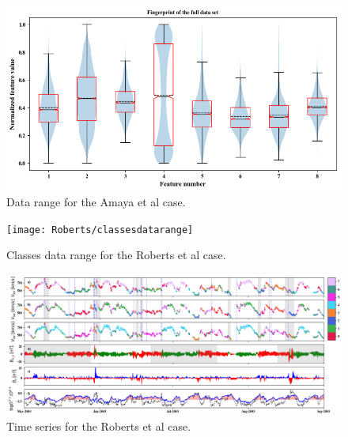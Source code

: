 \documentclass[utf8]{frontiersSCNS} %
\begin{document}
\begin{figure}[h!]
	\begin{center}
		\includegraphics[width=16cm]{Roberts/datarange}%
	\end{center}
	\caption{ Data range for the Amaya et al case.}\label{fig:datarange}
\end{figure}

\begin{figure}[h!]
	\begin{center}
		\texttt{[image: Roberts/classesdatarange]}%
	\end{center}
	\caption{ Classes data range for the Roberts et al case.}\label{fig:classesdatarange}
\end{figure}

\begin{figure}[h!]
	\begin{center}
		\includegraphics[width=18cm]{Roberts/timeseries}%
	\end{center}
	\caption{ Time series for the Roberts et al case.}\label{fig:timeseries}
\end{figure}
\end{document}
